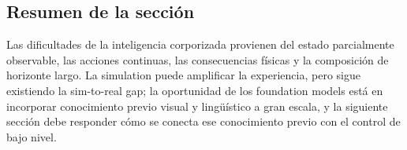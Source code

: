
\subsection{Resumen de la sección}

Las dificultades de la inteligencia corporizada provienen del estado parcialmente observable, las acciones continuas, las consecuencias físicas y la composición de horizonte largo. La simulation puede amplificar la experiencia, pero sigue existiendo la sim-to-real gap; la oportunidad de los foundation models está en incorporar conocimiento previo visual y lingüístico a gran escala, y la siguiente sección debe responder cómo se conecta ese conocimiento previo con el control de bajo nivel.
